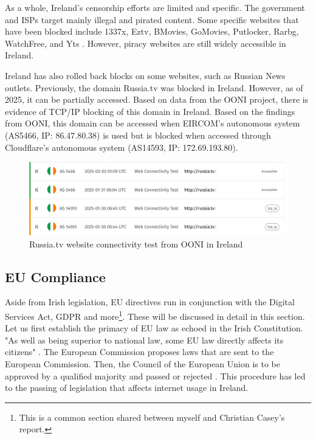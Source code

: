 As a whole, Ireland's censorship efforts are limited and specific. The government and ISPs target mainly illegal and pirated content. Some specific websites that have been blocked include 1337x, Eztv, BMovies, GoMovies, Putlocker, Rarbg, WatchFree, and Yts \cite{siliconrepublicMovieIndustry}. However, piracy websites are still widely accessible in Ireland.

Ireland has also rolled back blocks on some websites, such as Russian News outlets. Previously, the domain Russia.tv was blocked in Ireland. However, as of 2025, it can be partially accessed. Based on data from the OONI project, there is evidence of TCP/IP blocking of this domain in Ireland. Based on the findings from OONI, this domain can be accessed when EIRCOM's autonomous system (AS5466, IP: 86.47.80.38) is used but is blocked when accessed through Cloudflare's autonomous system (AS14593, IP: 172.69.193.80).


\begin{figure}[H]
    \centering
    \includegraphics[width=\textwidth]{Griff/TCD SCSS CAPSTONE/Literature Review/RussiaTV search OONI.jpg}
    \caption{Russia.tv website connectivity test from OONI in Ireland}
    \label{fig:RussiaTV-OONI-TEST-IRELAND}
\end{figure}

\subsection{EU Compliance}
\label{sec:Chris-EU-Compliance}

Aside from Irish legislation, EU directives run in conjunction with the Digital Services Act, GDPR and more\footnote{This is a common section shared between myself and Christian Casey’s report.}. These will be discussed in detail in this section. Let us first establish the primacy of EU law as echoed in the Irish Constitution. "As well as being superior to national law, some EU law directly affects its citizens" \cite{citizensinformation2025}. The European Commission proposes laws that are sent to the European Commission. Then, the Council of the European Union is to be approved by a qualified majority and passed or rejected \cite{europa2025}. This procedure has led to the passing of legislation that affects internet usage in Ireland. 

